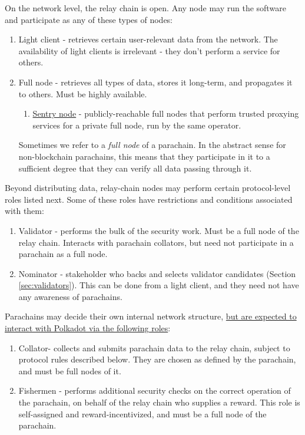 \documentclass{article}
\begin{document}
On the network level, the relay chain is open. Any node may run the software and participate as any of these types of nodes:

\begin{enumerate}
	\item Light client - retrieves certain user-relevant data from the network. The availability of light clients is irrelevant - they don't perform a service for others.
	\item Full node - retrieves all types of data, stores it long-term, and propagates it to others. Must be highly available.
	\begin{enumerate}
		\item \hyperref[sec:net_sentry]{Sentry node} - publicly-reachable full nodes that perform trusted proxying services for a private full node, run by the same operator.
	\end{enumerate}
	Sometimes we refer to a \emph{full node} of a parachain. In the abstract sense for non-blockchain parachains, this means that they participate in it to a sufficient degree that they can verify all data passing through it.
\end{enumerate}

Beyond distributing data, relay-chain nodes may perform certain protocol-level roles listed next. Some of these roles have restrictions and conditions associated with them:

\begin{enumerate}
	\item Validator - performs the bulk of the security work. Must be a full node of the relay chain. Interacts with parachain collators, but need not participate in a parachain as a full node. %
	\item Nominator - stakeholder who backs and selects validator candidates (Section \ref{sec:validators}). This can be done from a light client, and they need not have any awareness of parachains.
\end{enumerate}

Parachains may decide their own internal network structure, \uline{but are expected to interact with Polkadot via the following roles}:

\begin{enumerate}
	\item Collator\footnotemark[1] - collects and submits parachain data to the relay chain, subject to protocol rules described below. They are chosen as defined by the parachain, and must be full nodes of it.
	\item Fishermen - performs additional security checks on the correct operation of the parachain, on behalf of the relay chain who supplies a reward. This role is self-assigned and reward-incentivized, and must be a full node of the parachain.
\end{enumerate}
\end{document}
